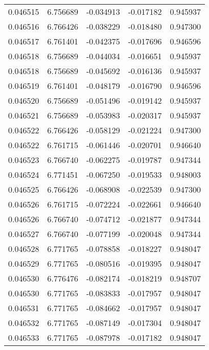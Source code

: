 \begin{tabular}{lrrrr}
0.046515    &  6.756689 & -0.034913 & -0.017182 &             0.945937 \\
0.046516    &  6.766426 & -0.038229 & -0.018480 &             0.947300 \\
0.046517    &  6.761401 & -0.042375 & -0.017696 &             0.946596 \\
0.046518    &  6.756689 & -0.044034 & -0.016651 &             0.945937 \\
0.046518    &  6.756689 & -0.045692 & -0.016136 &             0.945937 \\
0.046519    &  6.761401 & -0.048179 & -0.016790 &             0.946596 \\
0.046520    &  6.756689 & -0.051496 & -0.019142 &             0.945937 \\
0.046521    &  6.756689 & -0.053983 & -0.020317 &             0.945937 \\
0.046522    &  6.766426 & -0.058129 & -0.021224 &             0.947300 \\
0.046522    &  6.761715 & -0.061446 & -0.020701 &             0.946640 \\
0.046523    &  6.766740 & -0.062275 & -0.019787 &             0.947344 \\
0.046524    &  6.771451 & -0.067250 & -0.019533 &             0.948003 \\
0.046525    &  6.766426 & -0.068908 & -0.022539 &             0.947300 \\
0.046526    &  6.761715 & -0.072224 & -0.022661 &             0.946640 \\
0.046526    &  6.766740 & -0.074712 & -0.021877 &             0.947344 \\
0.046527    &  6.766740 & -0.077199 & -0.020048 &             0.947344 \\
0.046528    &  6.771765 & -0.078858 & -0.018227 &             0.948047 \\
0.046529    &  6.771765 & -0.080516 & -0.019395 &             0.948047 \\
0.046530    &  6.776476 & -0.082174 & -0.018219 &             0.948707 \\
0.046530    &  6.771765 & -0.083833 & -0.017957 &             0.948047 \\
0.046531    &  6.771765 & -0.084662 & -0.017957 &             0.948047 \\
0.046532    &  6.771765 & -0.087149 & -0.017304 &             0.948047 \\
0.046533    &  6.771765 & -0.087978 & -0.017182 &             0.948047 \\

\end{tabular}
